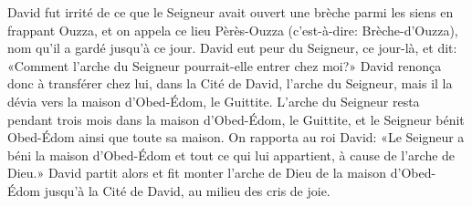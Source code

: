 David fut irrité de ce que le Seigneur avait ouvert une brèche parmi les siens
		en frappant Ouzza,
	et on appela ce lieu Pèrès-Ouzza (c’est-à-dire: Brèche-d’Ouzza),
	nom qu’il a gardé jusqu’à ce jour.
David eut peur du Seigneur, ce jour-là, et dit:
	«Comment l’arche du Seigneur pourrait-elle entrer chez moi?»
David renonça donc à transférer chez lui, dans la Cité de David, l’arche du Seigneur,
	mais il la dévia vers la maison d’Obed-Édom, le Guittite.
L’arche du Seigneur resta pendant trois mois dans la maison d’Obed-Édom, le Guittite,
	et le Seigneur bénit Obed-Édom ainsi que toute sa maison.
On rapporta au roi David:
	«Le Seigneur a béni la maison d’Obed-Édom et tout ce qui lui appartient,
	à cause de l’arche de Dieu.»
David partit alors et fit monter l’arche de Dieu
		de la maison d’Obed-Édom jusqu’à la Cité de David,
	au milieu des cris de joie.
